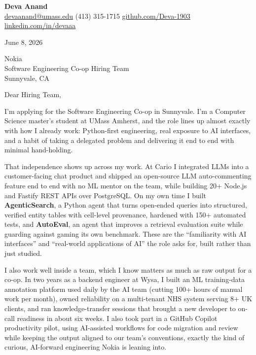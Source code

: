 \documentclass[letterpaper,11pt]{article}
\begin{document}
\begin{center}
  {\LARGE \bfseries \textcolor{ResumeNavy}{Deva Anand}} \\[3pt]
  {\small
  \href{mailto:devaanand@umass.edu}{devaanand@umass.edu} \enspace\textbar\enspace
  (413) 315-1715 \enspace\textbar\enspace
  \href{https://github.com/Deva-1903}{github.com/Deva-1903} \enspace\textbar\enspace
  \href{https://linkedin.com/in/devaaa/}{linkedin.com/in/devaaa}}
\end{center}
\vspace{6pt}

June 8, 2026

\vspace{2pt}
Nokia \\
Software Engineering Co-op Hiring Team \\
Sunnyvale, CA

\vspace{6pt}
Dear Hiring Team,

I'm applying for the Software Engineering Co-op in Sunnyvale. I'm a Computer Science master's student at UMass Amherst, and the role lines up almost exactly with how I already work: Python-first engineering, real exposure to AI interfaces, and a habit of taking a delegated problem and delivering it end to end with minimal hand-holding.

That independence shows up across my work. At Cario I integrated LLMs into a customer-facing chat product and shipped an open-source LLM auto-commenting feature end to end with no ML mentor on the team, while building 20+ Node.js and Fastify REST APIs over PostgreSQL. On my own time I built \textbf{AgenticSearch}, a Python agent that turns open-ended queries into structured, verified entity tables with cell-level provenance, hardened with 150+ automated tests, and \textbf{AutoEval}, an agent that improves a retrieval evaluation suite while guarding against gaming its own benchmark. These are the ``familiarity with AI interfaces'' and ``real-world applications of AI'' the role asks for, built rather than just studied.

I also work well inside a team, which I know matters as much as raw output for a co-op. In two years as a backend engineer at Wysa, I built an ML training-data annotation platform used daily by the AI team (cutting 100+ hours of manual work per month), owned reliability on a multi-tenant NHS system serving 8+ UK clients, and ran knowledge-transfer sessions that brought a new developer to on-call readiness in about six weeks. I also took part in a GitHub Copilot productivity pilot, using AI-assisted workflows for code migration and review while keeping the output aligned to our team's conventions, exactly the kind of curious, AI-forward engineering Nokia is leaning into.
\end{document}
